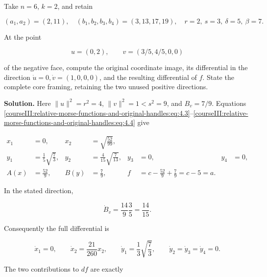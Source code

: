 \label{courseIII:relative-morse:5.1}

Take \(n=6\), \(k=2\), and retain

\begin{equation}
(a_1,a_2)=(2,11),\quad
(b_1,b_2,b_3,b_4)=(3,13,17,19),\quad
r=2,\ s=3,\ \delta=5,\ \beta=7.
\label{courseIII:relative-morse-functions-and-original-handles:eq:5.1}
\end{equation}

At the point

\begin{equation}
u=(0,2),\qquad v=(3/5,4/5,0,0)
\label{courseIII:relative-morse-functions-and-original-handles:eq:5.2}
\end{equation}

of the negative face, compute the original coordinate image, its differential in the direction \(\dot u=0,\dot v=(1,0,0,0)\), and the resulting differential of \(f\). State the complete core framing, retaining the two unused positive directions.

\textbf{Solution.} Here \(\|u\|^2=r^2=4\), \(\|v\|^2=1<s^2=9\), and \(B_v=7/9\). Equations \eqref{courseIII:relative-morse-functions-and-original-handles:eq:4.3}--\eqref{courseIII:relative-morse-functions-and-original-handles:eq:4.4} give

\begin{equation}
\begin{aligned}
x_1&=0,&x_2&=\sqrt{\frac{52}{99}},\\
y_1&=\frac15\sqrt{\frac73},&
y_2&=\frac4{15}\sqrt{\frac7{13}},&
y_3&=0,&y_4&=0,\\
A(x)&=\frac{52}{9},&
B(y)&=\frac79,&
f&=c-\frac{52}{9}+\frac79=c-5=a.
\end{aligned}
\label{courseIII:relative-morse-functions-and-original-handles:eq:5.3}
\end{equation}

In the stated direction,

\[
\dot B_v=\frac{14}{9}\frac35=\frac{14}{15}.
\]

Consequently the full differential is

\begin{equation}
\dot x_1=0,\qquad
\dot x_2=\frac{21}{260}x_2,\qquad
\dot y_1=\frac13\sqrt{\frac73},\qquad
\dot y_2=\dot y_3=\dot y_4=0.
\label{courseIII:relative-morse-functions-and-original-handles:eq:5.4}
\end{equation}

The two contributions to \(df\) are exactly

